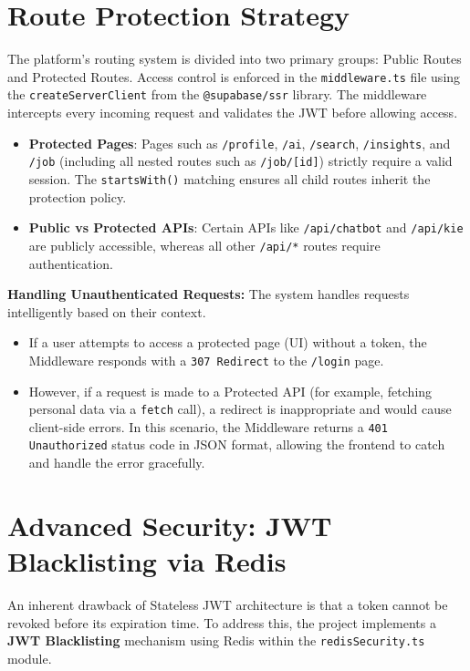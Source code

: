 \section{Route Protection Strategy}

The platform's routing system is divided into two primary groups: Public Routes and Protected Routes. Access control is enforced in the \texttt{middleware.ts} file using the \texttt{createServerClient} from the \texttt{@supabase/ssr} library. The middleware intercepts every incoming request and validates the JWT before allowing access.

\begin{itemize}
\item \textbf{Protected Pages}: Pages such as \texttt{/profile}, \texttt{/ai}, \texttt{/search}, \texttt{/insights}, and \texttt{/job} (including all nested routes such as \texttt{/job/[id]}) strictly require a valid session. The \texttt{startsWith()} matching ensures all child routes inherit the protection policy.
\item \textbf{Public vs Protected APIs}: Certain APIs like \texttt{/api/chatbot} and \texttt{/api/kie} are publicly accessible, whereas all other \texttt{/api/*} routes require authentication.
\end{itemize}

\textbf{Handling Unauthenticated Requests:}
The system handles requests intelligently based on their context.
\begin{itemize}
\item If a user attempts to access a protected page (UI) without a token, the Middleware responds with a \texttt{307 Redirect} to the \texttt{/login} page.
\item However, if a request is made to a Protected API (for example, fetching personal data via a \texttt{fetch} call), a redirect is inappropriate and would cause client-side errors. In this scenario, the Middleware returns a \texttt{401 Unauthorized} status code in JSON format, allowing the frontend to catch and handle the error gracefully.
\end{itemize}

\section{Advanced Security: JWT Blacklisting via Redis}

An inherent drawback of Stateless JWT architecture is that a token cannot be revoked before its expiration time. To address this, the project implements a \textbf{JWT Blacklisting} mechanism using Redis within the \texttt{redisSecurity.ts} module.

